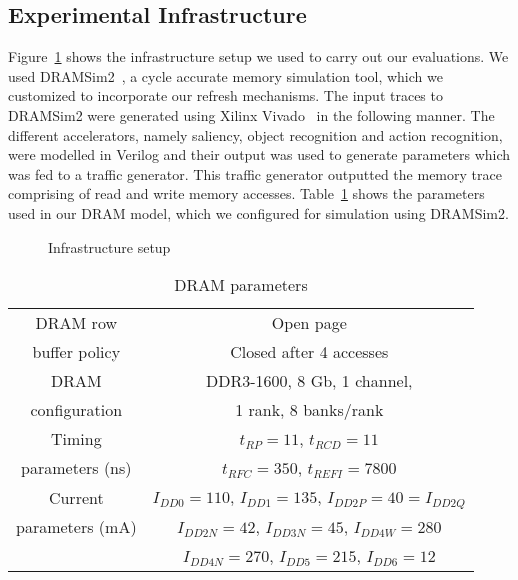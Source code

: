 \subsection{Experimental Infrastructure}
Figure~\ref{fig:experimental-setup} shows the infrastructure setup we used to carry out our evaluations.
We used DRAMSim2~\cite{DRAMsim2}, a cycle accurate memory simulation tool, which we customized to incorporate our refresh mechanisms. 
The input traces to DRAMSim2 were generated using Xilinx Vivado~\cite{vivado} in the following manner.
The different accelerators, namely saliency, object recognition and action recognition, were modelled in Verilog and their output was used to generate parameters which was fed to a traffic generator.
This traffic generator outputted the memory trace comprising of read and write memory accesses. Table~\ref{tab:dram-parameters} shows the parameters used in our DRAM model, which we configured for simulation using DRAMSim2.

\begin{figure}[ht!]
\centering
{}
\caption{\label{fig:experimental-setup} Infrastructure setup}
\end{figure}

\begin{table}[ht!]
\footnotesize
\centering
\begin{tabular}{|c|c|} \hline
DRAM row & Open page\\
buffer policy & Closed after 4 accesses\\\hline
DRAM & DDR3-1600, 8 Gb, 1 channel,\\
configuration &  1 rank, 8 banks/rank \\\hline
Timing & $t_{RP}=11$, $t_{RCD}=11$\\
parameters (ns) & $t_{RFC}=350$, $t_{REFI}=7800$ \\\hline
Current & $I_{DD0}=110$, $I_{DD1}=135$, $I_{DD2P}=40=I_{DD2Q}$ \\ 
parameters (mA) & $I_{DD2N}=42$, $I_{DD3N}=45$, $I_{DD4W}=280$ \\ 
&$I_{DD4N}=270$, $I_{DD5}=215$, $I_{DD6}=12$ \\\hline
\end{tabular}
\vspace{0.1in}
\caption {DRAM parameters}
\vspace{-0.2in}
\label{tab:dram-parameters}
\end{table}

